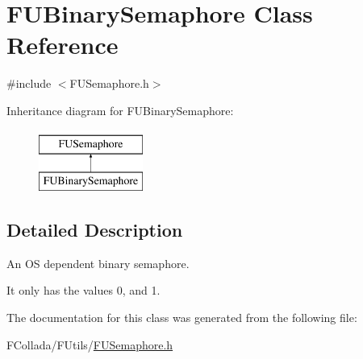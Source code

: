 \hypertarget{classFUBinarySemaphore}{
\section{FUBinarySemaphore Class Reference}
\label{classFUBinarySemaphore}
}


{\ttfamily \#include $<$FUSemaphore.h$>$}

Inheritance diagram for FUBinarySemaphore:\begin{figure}[H]
\begin{center}
\leavevmode
\includegraphics[height=2.000000cm]{classFUBinarySemaphore}
\end{center}
\end{figure}


\subsection{Detailed Description}
An OS dependent binary semaphore.

It only has the values 0, and 1. 

The documentation for this class was generated from the following file:\begin{DoxyCompactItemize}
\item 
FCollada/FUtils/\hyperlink{FUSemaphore_8h}{FUSemaphore.h}\end{DoxyCompactItemize}
